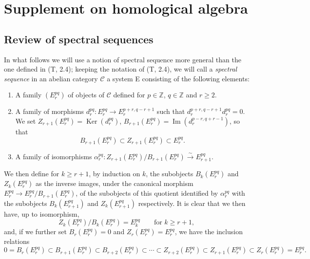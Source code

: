 \section{Supplement on homological algebra}
\label{section:0.11}

\subsection{Review of spectral sequences}
\label{subsection:0.11.1}

\begin{env}[11.1.1]
\label{0.11.1.1}
In what follows we will use a notion of spectral sequence more general than
the one defined in (T, 2.4); keeping the notation of (T, 2.4), we will
call a \emph{spectral sequence} in an abelian category $\mathcal C$ a
system E consisting of the following elements:
\begin{enumerate}
  \item[(a)] A family $(E_r^{pq})$ of objects of $\mathcal C$ defined for
    $p\in\mathbb Z$, $q\in\mathbb Z$ and $r\geq2$.
  \item[(b)] A family of morphisms
    $d_r^{pq}:E_r^{pq}\to E_r^{p+r,q-r+1}$ such that
    $d_r^{p+r,q-r+1}d_r^{pq}=0$. We set
    $Z_{r+1}(E_r^{pq})=\operatorname{Ker}(d_r^{pq})$,
    $B_{r+1}(E_r^{pq})=\operatorname{Im}(d_r^{p-r,q+r-1})$, so that
    \[
      B_{r+1}(E_r^{pq})\subset Z_{r+1}(E_r^{pq})\subset E_r^{pq}.
    \]
  \item[(c)] A family of isomorphisms
    $\alpha_r^{pq}:Z_{r+1}(E_r^{pq})/B_{r+1}(E_r^{pq})
    \xrightarrow{\sim}E_{r+1}^{pq}$.
\end{enumerate}

We then define for $k\geq r+1$, by induction on $k$, the subobjects
$B_k(E_r^{pq})$ and $Z_k(E_r^{pq})$ as the inverse images, under the
canonical morphism $E_r^{pq}\to E_r^{pq}/B_{r+1}(E_r^{pq})$, of the subobjects of
this quotient identified by $\alpha_r^{pq}$ with the subobjects $B_k(E_{r+1}^{pq})$ and
$Z_k(E_{r+1}^{pq})$ respectively. It is clear that we then have, up to
isomorphism,
\[
\label{0.11.1.1.1}
  Z_k(E_r^{pq})/B_k(E_r^{pq})=E_k^{pq}
  \qquad\text{for }k\geq r+1,
  \tag{11.1.1.1}
\]
and, if we further set $B_r(E_r^{pq})=0$ and $Z_r(E_r^{pq})=E_r^{pq}$, we have
the inclusion relations
\[
\label{0.11.1.1.2}
  0=B_r(E_r^{pq})\subset B_{r+1}(E_r^{pq})\subset B_{r+2}(E_r^{pq})
  \subset\cdots\subset Z_{r+2}(E_r^{pq})\subset Z_{r+1}(E_r^{pq})
  \subset Z_r(E_r^{pq})=E_r^{pq}.
  \tag{11.1.1.2}
\]


\end{env}
